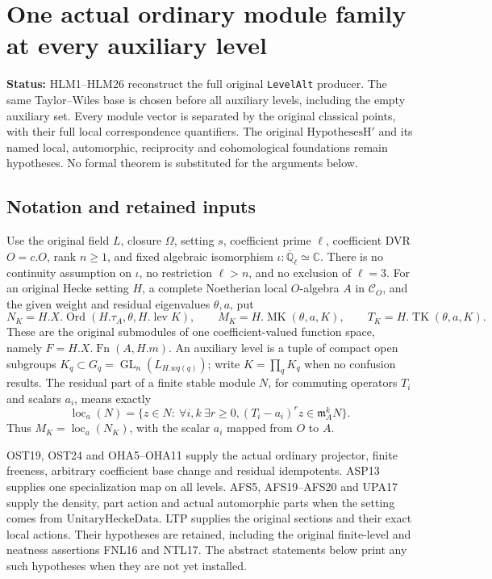 \documentclass[11pt,a4paper]{article}
\numberwithin{equation}{section}
\theoremstyle{remark}\newtheorem{remark}[theorem]{Remark}
\newcommand{\status}[1]{\textbf{Status:} #1}
\begin{document}
\section{One actual ordinary module family at every auxiliary level}
\label{sec:hida-level-modules-v45}

\status{HLM1--HLM26 reconstruct the full original \texttt{LevelAlt}
producer.  The same Taylor--Wiles base is chosen before all auxiliary
levels, including the empty auxiliary set.  Every module vector is
separated by the original classical points, with their full local
correspondence quantifiers.  The original \(\mathrm{HypothesesH}'\)
and its named local, automorphic, reciprocity and cohomological
foundations remain hypotheses.  No formal theorem is substituted
for the arguments below.}

\subsection{Notation and retained inputs}

Use the original field \(L\), closure \(\Omega\), setting \(s\),
coefficient prime \(\ell\), coefficient DVR \(O=c.O\), rank
\(n\geq1\), and fixed algebraic isomorphism
\(\iota:\overline{\mathbb Q}_\ell\simeq\mathbb C\).
There is no continuity assumption on \(\iota\), no restriction
\(\ell>n\), and no exclusion of \(\ell=3\).
For an original Hecke setting \(H\), a complete Noetherian local
\(O\)-algebra \(A\) in \(\mathcal C_O\), and the given weight
and residual eigenvalues \(\theta,a\), put
\[
 N_K=H.X.\operatorname{Ord}(H.\tau_A,\theta,H.\operatorname{lev}K),
 \qquad M_K=H.\operatorname{MK}(\theta,a,K),
 \qquad T_K=H.\operatorname{TK}(\theta,a,K).
 \tag{HLM.1}
\]
These are the original submodules of one coefficient-valued
function space, namely \(F=H.X.\operatorname{Fn}(A,H.m)\).
An auxiliary level is a tuple of compact open subgroups
\(K_q\subset G_q=\operatorname{GL}_n(L_{H.wq(q)})\);
write \(K=\prod_qK_q\) when no confusion results.
The residual part of a finite stable module \(N\), for commuting
operators \(T_i\) and scalars \(a_i\), means exactly
\[
 \operatorname{loc}_a(N)=
 \{z\in N:\ \forall i,k\ \exists r\geq0,
                    (T_i-a_i)^rz\in\mathfrak m_A^kN\}.
 \tag{HLM.2}
\]
Thus \(M_K=\operatorname{loc}_a(N_K)\), with the scalar
\(a_i\) mapped from \(O\) to \(A\).

OST19, OST24 and OHA5--OHA11 supply the actual ordinary projector,
finite freeness, arbitrary coefficient base change and residual
idempotents.  ASP13 supplies one specialization map on all levels.
AFS5, AFS19--AFS20 and UPA17 supply the density, part action and
actual automorphic parts when the setting comes from
\(\mathrm{UnitaryHeckeData}\).  LTP supplies the original sections
and their exact local actions.  Their hypotheses are retained,
including the original finite-level and neatness assertions FNL16
and NTL17.  The abstract statements below print any such hypotheses
when they are not yet installed.
\end{document}
